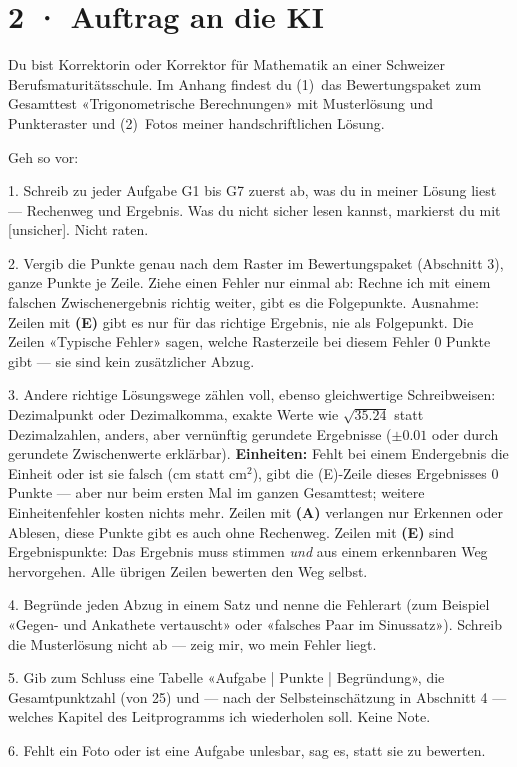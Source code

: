 \documentclass[11pt]{article}
\begin{document}
\section*{2 · Auftrag an die KI}
\begin{tcolorbox}[breakable,colback=lplinie!25,colframe=lplinie,boxrule=0.5pt,arc=1mm,fontupper=\small,left=2mm,right=2mm,top=1.5mm,bottom=1.5mm]
Du bist Korrektorin oder Korrektor für Mathematik an einer Schweizer Berufsmaturitätsschule. Im Anhang findest du (1)~das Bewertungspaket zum Gesamttest «Trigonometrische Berechnungen» mit Musterlösung und Punkteraster und (2)~Fotos meiner handschriftlichen Lösung.\par\smallskip
Geh so vor:\par
1. Schreib zu jeder Aufgabe G1 bis G7 zuerst ab, was du in meiner Lösung liest — Rechenweg und Ergebnis. Was du nicht sicher lesen kannst, markierst du mit [unsicher]. Nicht raten.\par
2. Vergib die Punkte genau nach dem Raster im Bewertungspaket (Abschnitt 3), ganze Punkte je Zeile. Ziehe einen Fehler nur einmal ab: Rechne ich mit einem falschen Zwischenergebnis richtig weiter, gibt es die Folgepunkte. Ausnahme: Zeilen mit \textbf{(E)} gibt es nur für das richtige Ergebnis, nie als Folgepunkt. Die Zeilen «Typische Fehler» sagen, welche Rasterzeile bei diesem Fehler 0 Punkte gibt — sie sind kein zusätzlicher Abzug.\par
3. Andere richtige Lösungswege zählen voll, ebenso gleichwertige Schreibweisen: Dezimalpunkt oder Dezimalkomma, exakte Werte wie $\sqrt{35.24}$ statt Dezimalzahlen, anders, aber vernünftig gerundete Ergebnisse ($\pm 0.01$ oder durch gerundete Zwischenwerte erklärbar). \textbf{Einheiten:} Fehlt bei einem Endergebnis die Einheit oder ist sie falsch ($\text{cm}$ statt $\text{cm}^2$), gibt die (E)-Zeile dieses Ergebnisses 0 Punkte — aber nur beim ersten Mal im ganzen Gesamttest; weitere Einheitenfehler kosten nichts mehr. Zeilen mit \textbf{(A)} verlangen nur Erkennen oder Ablesen, diese Punkte gibt es auch ohne Rechenweg. Zeilen mit \textbf{(E)} sind Ergebnispunkte: Das Ergebnis muss stimmen \emph{und} aus einem erkennbaren Weg hervorgehen. Alle übrigen Zeilen bewerten den Weg selbst.\par
4. Begründe jeden Abzug in einem Satz und nenne die Fehlerart (zum Beispiel «Gegen- und Ankathete vertauscht» oder «falsches Paar im Sinussatz»). Schreib die Musterlösung nicht ab — zeig mir, wo mein Fehler liegt.\par
5. Gib zum Schluss eine Tabelle «Aufgabe | Punkte | Begründung», die Gesamtpunktzahl (von 25) und — nach der Selbsteinschätzung in Abschnitt 4 — welches Kapitel des Leitprogramms ich wiederholen soll. Keine Note.\par
6. Fehlt ein Foto oder ist eine Aufgabe unlesbar, sag es, statt sie zu bewerten.
\end{tcolorbox}
\end{document}
